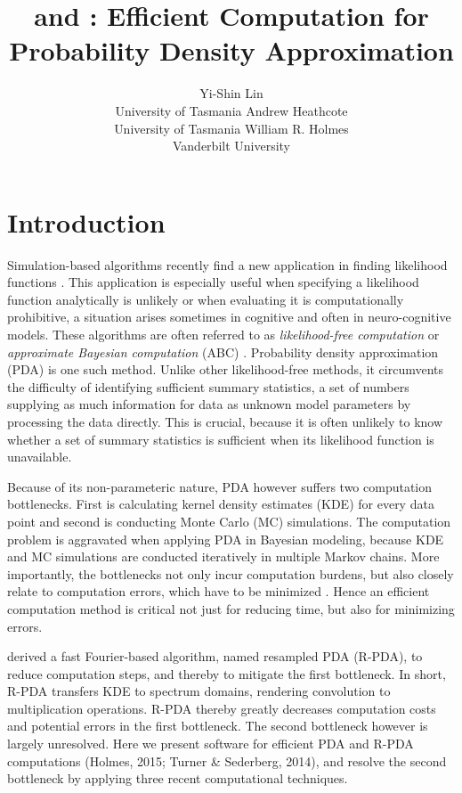 \documentclass[shortnames,nojss,article]{jss}
\author{Yi-Shin Lin\\University of Tasmania \And
Andrew Heathcote\\University of Tasmania \And
William R. Holmes\\Vanderbilt University}
\title{\proglang{cpda} and \proglang{gpda}: Efficient Computation for
Probability Density Approximation}
\begin{document}
\vspace*{.25cm}

\section{Introduction}
\label{sec:intro}
Simulation-based algorithms recently find a new
application in finding likelihood functions \citep{sisson_likelihood_2010}.
This application is especially useful when specifying a likelihood function 
analytically is unlikely or
when evaluating it is computationally prohibitive, a situation
arises sometimes in cognitive and often in neuro-cognitive models. These
algorithms are often referred to as \textit{likelihood-free computation} or
\textit{approximate Bayesian computation} (ABC) \citep{sisson_likelihood_2010}.
Probability density approximation (PDA) is one such
method. Unlike other likelihood-free methods, it
circumvents the difficulty of identifying sufficient summary statistics,
a set of numbers supplying as much information for data as unknown model
parameters \citep{turner_generalized_2014} by processing the data directly. This is
crucial, because it is often unlikely to know whether a set of summary
statistics is sufficient when its likelihood function is unavailable.

Because of its non-parameteric nature, PDA however suffers two computation
bottlenecks.  First is calculating kernel density estimates (KDE) for every
data point and second is conducting Monte Carlo (MC) simulations.
The computation problem is aggravated when applying PDA in Bayesian modeling,
because KDE and MC simulations are conducted iteratively in
multiple Markov chains. More importantly, the bottlenecks not only incur
computation burdens, but also
closely relate to computation errors, which have to be minimized
\citep{turner_generalized_2014}. Hence an efficient computation method is critical
not just for reducing time, but also for minimizing errors.

\cite{holmes_practical_2015} derived a fast Fourier-based algorithm, named resampled PDA
(R-PDA), to reduce computation steps, and thereby to mitigate the first
bottleneck.  In short, R-PDA transfers KDE to spectrum domains, rendering
convolution
to multiplication operations. R-PDA thereby greatly decreases
computation costs and potential errors in the first bottleneck. The second
bottleneck however is largely unresolved. Here we present software for
efficient PDA and R-PDA computations (Holmes, 2015; Turner \& Sederberg, 2014),
and resolve the second bottleneck by applying three recent computational
techniques.
\end{document}
